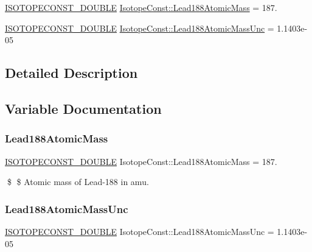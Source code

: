 \begin{DoxyCompactItemize}
\item 
\mbox{\hyperlink{group___isotope_const-_macros_ga8f45a7272ce02c0b4c65c44636ed719a}{I\+S\+O\+T\+O\+P\+E\+C\+O\+N\+S\+T\+\_\+\+D\+O\+U\+B\+LE}} \mbox{\hyperlink{group___isotope_const-_lead-_pb188_ga1436dfce261b28661fbe725bfb6fadd4}{Isotope\+Const\+::\+Lead188\+Atomic\+Mass}} = 187.
\item 
\mbox{\hyperlink{group___isotope_const-_macros_ga8f45a7272ce02c0b4c65c44636ed719a}{I\+S\+O\+T\+O\+P\+E\+C\+O\+N\+S\+T\+\_\+\+D\+O\+U\+B\+LE}} \mbox{\hyperlink{group___isotope_const-_lead-_pb188_gac7bc5c5234c79f7735f374511a996717}{Isotope\+Const\+::\+Lead188\+Atomic\+Mass\+Unc}} = 1.\+1403e-\/05
\end{DoxyCompactItemize}


\subsection{Detailed Description}


\subsection{Variable Documentation}
\mbox{\label{group___isotope_const-_lead-_pb188_ga1436dfce261b28661fbe725bfb6fadd4}} 
\subsubsection{\texorpdfstring{Lead188\+Atomic\+Mass}{Lead188AtomicMass}}
{\footnotesize\ttfamily \mbox{\hyperlink{group___isotope_const-_macros_ga8f45a7272ce02c0b4c65c44636ed719a}{I\+S\+O\+T\+O\+P\+E\+C\+O\+N\+S\+T\+\_\+\+D\+O\+U\+B\+LE}} Isotope\+Const\+::\+Lead188\+Atomic\+Mass = 187.}

\$ \$ Atomic mass of Lead-\/188 in amu. \mbox{\label{group___isotope_const-_lead-_pb188_gac7bc5c5234c79f7735f374511a996717}} 
\subsubsection{\texorpdfstring{Lead188\+Atomic\+Mass\+Unc}{Lead188AtomicMassUnc}}
{\footnotesize\ttfamily \mbox{\hyperlink{group___isotope_const-_macros_ga8f45a7272ce02c0b4c65c44636ed719a}{I\+S\+O\+T\+O\+P\+E\+C\+O\+N\+S\+T\+\_\+\+D\+O\+U\+B\+LE}} Isotope\+Const\+::\+Lead188\+Atomic\+Mass\+Unc = 1.\+1403e-\/05}

